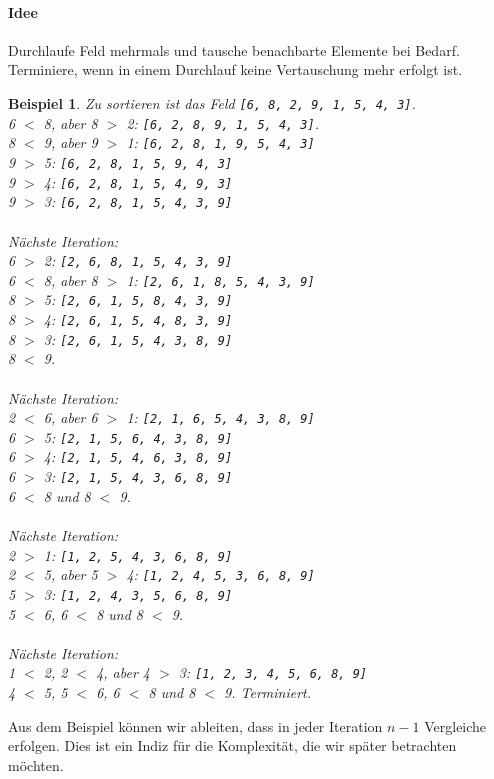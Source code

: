 \documentclass[11pt,a4paper]{scrartcl}
\newtheorem{example}{Beispiel}
\begin{document}
\paragraph{Idee} Durchlaufe Feld mehrmals und tausche benachbarte Elemente bei Bedarf. Terminiere, wenn in einem Durchlauf keine Vertauschung mehr erfolgt ist.
\begin{example}
Zu sortieren ist das Feld \texttt{[6, 8, 2, 9, 1, 5, 4, 3]}. \\
6 $<$ 8, aber 8 $>$ 2: \texttt{[6, 2, 8, 9, 1, 5, 4, 3]}. \\
8 $<$ 9, aber 9 $>$ 1: \texttt{[6, 2, 8, 1, 9, 5, 4, 3]} \\
9 $>$ 5: \texttt{[6, 2, 8, 1, 5, 9, 4, 3]} \\
9 $>$ 4: \texttt{[6, 2, 8, 1, 5, 4, 9, 3]} \\
9 $>$ 3: \texttt{[6, 2, 8, 1, 5, 4, 3, 9]} \\\\
Nächste Iteration: \\
6 $>$ 2: \texttt{[2, 6, 8, 1, 5, 4, 3, 9]} \\
6 $<$ 8, aber 8 $>$ 1: \texttt{[2, 6, 1, 8, 5, 4, 3, 9]} \\
8 $>$ 5: \texttt{[2, 6, 1, 5, 8, 4, 3, 9]} \\
8 $>$ 4: \texttt{[2, 6, 1, 5, 4, 8, 3, 9]} \\
8 $>$ 3: \texttt{[2, 6, 1, 5, 4, 3, 8, 9]} \\
8 $<$ 9. \\\\
Nächste Iteration:\\
2 $<$ 6, aber 6 $>$ 1: \texttt{[2, 1, 6, 5, 4, 3, 8, 9]} \\
6 $>$ 5: \texttt{[2, 1, 5, 6, 4, 3, 8, 9]} \\
6 $>$ 4: \texttt{[2, 1, 5, 4, 6, 3, 8, 9]} \\
6 $>$ 3: \texttt{[2, 1, 5, 4, 3, 6, 8, 9]} \\
6 $<$ 8 und 8 $<$ 9. \\\\
Nächste Iteration:\\
2 $>$ 1: \texttt{[1, 2, 5, 4, 3, 6, 8, 9]} \\
2 $<$ 5, aber 5 $>$ 4: \texttt{[1, 2, 4, 5, 3, 6, 8, 9]} \\
5 $>$ 3: \texttt{[1, 2, 4, 3, 5, 6, 8, 9]} \\
5 $<$ 6, 6 $<$ 8 und 8 $<$ 9. \\\\
Nächste Iteration: \\
1 $<$ 2, 2 $<$ 4, aber 4 $>$ 3: \texttt{[1, 2, 3, 4, 5, 6, 8, 9]} \\
4 $<$ 5, 5 $<$ 6, 6 $<$ 8 und 8 $<$ 9. Terminiert.
\end{example}
Aus dem Beispiel können wir ableiten, dass in jeder Iteration $n-1$ Vergleiche erfolgen. Dies ist ein Indiz für die Komplexität, die wir später betrachten möchten.
\end{document}
